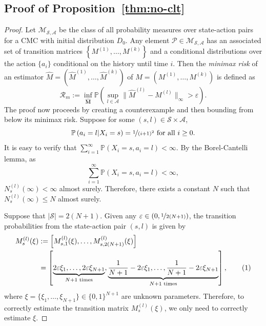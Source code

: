 \documentclass[twoside,11pt]{article}
\newcommand{\pow}[1]{^{(#1)}}%
\numberwithin{equation}{section}
\newcommand{\lp}{\left(}
\newcommand{\rp}{\right)}
\newcommand{\lc}{\left\{}
\newcommand{\rc}{\right\}}
\newcommand{\lb}{\left[}
\newcommand{\rb}{\right]}
\newcommand{\Pbb}{\mathbb{P}}
\newcommand{\Mcal}{\mathcal{M}}
\newcommand{\Pcal}{\mathcal{P}}
\newcommand{\Rcal}{\mathcal{R}}
\newcommand\numberthis{\addtocounter{equation}{1}\tag{\theequation}}
\newcommand{\prob}{\Pbb}
\newcommand{\initialD}{D_0}
\newcommand{\eps}{\varepsilon}
\renewcommand{\epsilon}{\eps}
\begin{document}
\subsection{Proof of Proposition~\ref{thm:no-clt}}
\label{sec:proof-no-clt}
\begin{proof}
Let $\Mcal_{\mathcal S,\mathcal A}$ be the class of all probability measures over state-action pairs for a CMC with initial distribution $\initialD$. 
Any element $\Pcal\in \Mcal_{\mathcal S,\mathcal A}$ has an associated set of transition matrices $\lc M\pow 1,\dots,M\pow k\rc$ and a conditional distributions over the action $\{a_i\}$ conditional on the history until time $i$.  
Then the \emph{minimax risk} of an estimator $\hat M =(\hat M\pow 1,\dots, \hat M\pow k)$ of $M=(M\pow 1,\dots,M\pow k)$ is defined as
\[
\Rcal_m := \inf_{\mathbf{\hat M}}\prob\lp \sup_{l\in\mathcal A}\| \hat M\pow l-M\pow l \|_{\infty} >\eps \rp.
\]    
The proof now proceeds by creating a counterexample and then bounding from below its minimax risk.
Suppose for some $(s,l) \in \mathcal S \times \mathcal A$,
\[
\mathbb P\lp a_i=l | X_i = s\rp = \nicefrac{1}{(i+1)^2} \text{ for all } i \geq 0.
\]
It is easy to verify that $\sum_{i=1}^{\infty}\prob\lp X_i=s, a_i=l \rp < \infty$.
By the Borel-Cantelli lemma, as \[\sum_{i=1}^{\infty}\prob\lp X_i=s, a_i=l \rp < \infty,\] 
$N_s \pow l(\infty) < \infty$ 
almost surely. 
Therefore, there exists a constant $N$ such that $N_s \pow l (\infty) \leq N$ almost surely.

Suppose that $|\mathcal S| = 2(N+1)$.
Given any $\epsilon \in (0, \nicefrac{1}{2(N+1)})$, the transition probabilities from the state-action pair $(s,l)$ is given by 
\begin{align*}
M_s \pow l(\xi) & := \lb M_{s,1} \pow l(\xi), \ldots, M_{s,2(N+1)} \pow l(\xi)\rb \\
& = \lb \underbrace{2\epsilon \xi_1, \ldots, 2\epsilon \xi_{N+1}}_{N+1 \text{ times}}, \underbrace{\frac{1}{N+1} - 2\epsilon \xi_1, \ldots, \frac{1}{N+1} - 2\epsilon \xi_{N+1}}_{N+1 \text{ times}} \rb, \numberthis\label{eq:xi_kernel}
\end{align*}
where $\xi = \{\xi_1, \ldots, \xi_{N+1}\} \in \{0, 1\}^{N+1}$ are unknown parameters.
Therefore, to correctly estimate the transition matrix $M_s \pow l(\xi)$, we only need to correctly estimate $\xi$. 


\end{proof}
\end{document}
